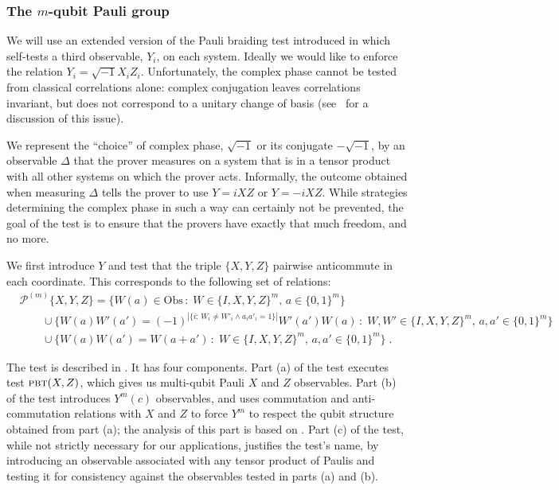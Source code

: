 \documentclass{toc}
\newcommand{\setft}[1]{\mathrm{#1}}
\newcommand{\Obs}{\setft{Obs}}
\newcommand{\pbt}{\textsc{pbt}}
\newcommand{\paulin}{\mathcal{P}^{(m)}\!}
\begin{document}
\newpage %

\subsubsection{The \texorpdfstring{$m$}{m}-qubit Pauli group}
\label{sec:e-pbt}


We will use an extended version of the Pauli braiding test introduced in  which self-tests a third observable, $Y_i$, on each system. Ideally we would like to enforce the relation $Y_i=\sqrt{-1}X_iZ_i$. Unfortunately, the complex phase cannot be tested from classical correlations alone: complex conjugation leaves correlations invariant, but does not correspond to a unitary change of basis  (see~\cite[Appendix A]{reichardt2012classicalarxiv} for a discussion of this issue). 

We represent the ``choice'' of complex phase, $\sqrt{-1}$ or its conjugate $-\sqrt{-1}$, by an observable $\Delta$ that the prover measures on a system that is in a tensor product with all other systems on which the prover acts. Informally, the outcome obtained when measuring $\Delta$ tells the prover to use $Y = i XZ$ or $Y=-iXZ$. While strategies determining the complex phase in such a way can certainly not be prevented, the goal of the test is to ensure that the provers have exactly that much freedom, and no more. 

We first introduce $Y$ and test that the triple $\{X,Y,Z\}$ pairwise anticommute in each coordinate. This corresponds to the following set of relations: 
\begin{align*}
& {\paulin}\{X,Y,Z\} = \Big\{ W(a)\in\Obs\,:\;W \in \{I,X,Y,Z\}^m,\,a\in\{0,1\}^m\Big\} \\
&\qquad\cup \Big\{W(a)W'(a')=(-1)^{|\{i:\,W_i\neq W'_i \wedge a_ia'_i=1\}|} W'(a')W(a)\,:\;W,W' \in \{I,X,Y,Z\}^m,\,a,a'\in\{0,1\}^m\Big\}\\
&\qquad \cup\Big\{ W(a)W(a')=W(a+a')\,:\;W \in \{I,X,Y,Z\}^m,\,a,a'\in\{0,1\}^m\Big\}\;.
\end{align*}


The test is described in . It has four components. Part (a) of the test executes test $\pbt(X,Z)$, which gives us multi-qubit Pauli $X$ and $Z$ observables. 
Part (b) of the test introduces $Y^m(c)$ observables, and uses commutation and anti-commutation relations with $X$ and $Z$ to force $Y^m$ to respect the qubit structure obtained from part (a); the analysis of this part is based on . Part (c) of the test, while not strictly necessary for our applications, justifies the test's name, by introducing an observable associated with any tensor product of Paulis and testing it for consistency against the observables tested in parts (a) and (b). 
\end{document}
